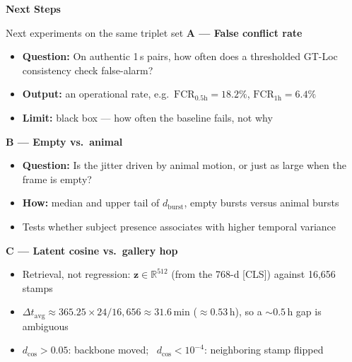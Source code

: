 \documentclass[aspectratio=169,11pt]{beamer}
\begin{document}
\begin{frame}[plain]
\begin{center}
\vspace{2.4cm}
{\color{aiia}\Huge\bfseries Next Steps}
\end{center}
\end{frame}

\begin{frame}{Next experiments on the same triplet set}
\small\setlength{\parskip}{0pt}
\textbf{A --- False conflict rate}
\begin{itemize}\setlength{\itemsep}{0.04em}
  \item \textbf{Question:} On authentic 1\,s pairs, how often does a thresholded GT-Loc consistency check false-alarm?
  \item \textbf{Output:} an operational rate, e.g.\ $\mathrm{FCR}_{0.5\mathrm{h}}=18.2\%$, $\mathrm{FCR}_{1\mathrm{h}}=6.4\%$
  \item \textbf{Limit:} black box --- how often the baseline fails, not why
\end{itemize}
\vspace{0.12em}
\textbf{B --- Empty vs.\ animal}
\begin{itemize}\setlength{\itemsep}{0.04em}
  \item \textbf{Question:} Is the jitter driven by animal motion, or just as large when the frame is empty?
  \item \textbf{How:} median and upper tail of $d_{\mathrm{burst}}$, empty bursts versus animal bursts
  \item Tests whether subject presence associates with higher temporal variance
\end{itemize}
\vspace{0.12em}
\textbf{C --- Latent cosine vs.\ gallery hop}
\begin{itemize}\setlength{\itemsep}{0.04em}
  \item Retrieval, not regression: $\mathbf{z}\in\mathbb{R}^{512}$ (from the 768-d [CLS]) against 16{,}656 stamps
  \item $\Delta t_{\mathrm{avg}}\approx 365.25\times 24/16{,}656\approx 31.6\,\mathrm{min}$ ($\approx 0.53\,\mathrm{h}$), so a $\sim 0.5\,\mathrm{h}$ gap is ambiguous
  \item $d_{\cos}>0.05$: backbone moved; \ $d_{\cos}<10^{-4}$: neighboring stamp flipped
\end{itemize}
\end{frame}
\end{document}
